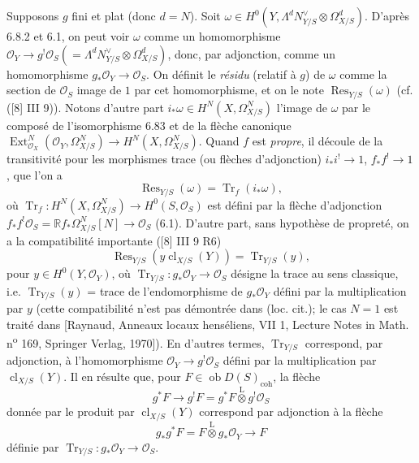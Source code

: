 \documentclass[11pt]{article}
\DeclareMathOperator{\Ext}{Ext}
\newcommand{\R}{\mathbb{R}}\newcommand{\RHomCore}{\mathbb{R}\mathrm{Hom}}
\newcommand{\ob}{\operatorname{ob}}
\providecommand{\cl}{\operatorname{cl}}
\providecommand{\OO}{\mathcal{O}}
\providecommand{\coh}{\mathrm{coh}}
\providecommand{\ob}{\operatorname{ob}}
\providecommand{\R}{\mathrm R}
\providecommand{\cl}{\operatorname{cl}}
\providecommand{\coh}{\mathrm{coh}}
\providecommand{\cl}{\operatorname{cl}}
\begin{document}
Supposons $g$ fini et plat (donc $d=N$). Soit $\omega\in H^0(Y,\Lambda^d N_{Y/S}^{\vee}\otimes\Omega^d_{X/S})$. D'après 6.8.2 et 6.1, on peut voir $\omega$ comme un homomorphisme $\OO_Y\longrightarrow g^!\OO_S(=\Lambda^d N_{Y/S}^{\vee}\otimes\Omega^d_{X/S})$, donc, par adjonction, comme un homomorphisme $g_*\OO_Y\to\OO_S$. On définit le \emph{résidu} (relatif à $g$) de $\omega$ comme la section de $\OO_S$ image de $1$ par cet homomorphisme, et on le note $\operatorname{Res}_{Y/S}(\omega)$ (cf. ([8] III 9)). Notons d'autre part $i_*\omega\in H^N(X,\Omega^N_{X/S})$ l'image de $\omega$ par le composé de l'isomorphisme 6.83 et de la flèche canonique $\Ext^N_{\OO_X}(\OO_Y,\Omega^N_{X/S})\longrightarrow H^N(X,\Omega^N_{X/S})$. Quand $f$ est \emph{propre}, il découle de la transitivité pour les morphismes trace (ou flèches d'adjonction) $i_*i^!\to 1$, $f_*f^!\to 1$, que l'on a
\begin{equation}
\tag{6.8.4}
\operatorname{Res}_{Y/S}(\omega)=\operatorname{Tr}_f(i_*\omega),
\end{equation}
où $\operatorname{Tr}_f:H^N(X,\Omega^N_{X/S})\to H^0(S,\OO_S)$ est défini par la flèche d'adjonction $f_*f^!\OO_S=\R f_*\Omega^N_{X/S}[N]\to\OO_S$ (6.1). D'autre part, sans hypothèse de propreté, on a la compatibilité importante ([8] III 9 R6)
\begin{equation}
\tag{6.8.5}
\operatorname{Res}_{Y/S}(y\cl_{X/S}(Y))=\operatorname{Tr}_{Y/S}(y),
\end{equation}
pour $y\in H^0(Y,\OO_Y)$, où $\operatorname{Tr}_{Y/S}:g_*\OO_Y\to\OO_S$ désigne la trace au sens classique, i.e. $\operatorname{Tr}_{Y/S}(y)$ = trace de l'endomorphisme de $g_*\OO_Y$ défini par la multiplication par $y$ (cette compatibilité n'est pas démontrée dans (loc. cit.); le cas $N=1$ est traité dans [Raynaud, Anneaux locaux henséliens, VII 1, Lecture Notes in Math. n\textsuperscript{o} 169, Springer Verlag, 1970]). En d'autres termes, $\operatorname{Tr}_{Y/S}$ correspond, par adjonction, à l'homomorphisme $\OO_Y\to g^!\OO_S$ défini par la multiplication par $\cl_{X/S}(Y)$. Il en résulte que, pour $F\in\ob D(S)_{\coh}$, la flèche
\begin{equation}
\tag{6.8.6}
g^*F\longrightarrow g^!F=g^*F\overset{\mathrm{L}}{\otimes}g^!\OO_S
\end{equation}
donnée par le produit par $\cl_{X/S}(Y)$ correspond par adjonction à la flèche
\begin{equation}
\tag{6.8.7}
g_*g^*F=F\overset{\mathrm{L}}{\otimes}g_*\OO_Y\longrightarrow F
\end{equation}
définie par $\operatorname{Tr}_{Y/S}:g_*\OO_Y\to\OO_S$.
\end{document}
